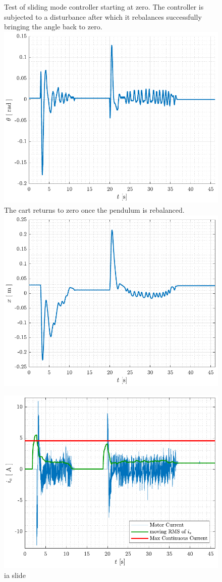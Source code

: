 %
\begin{figure}[H]
  \hspace{1cm}
  \captionbox
  {
    Test of sliding mode controller starting at zero. The controller is subjected to a disturbance after which it rebalances successfully bringing the angle back to zero.
    \label{fig:theta_slide}
  }
  {
    \hspace{-1cm}
    \includegraphics[width=.4\textwidth]{figures/theta_slide}
  }
  \hspace{20pt}
  \captionbox 
  {
    The cart returns to zero once the pendulum is rebalanced.
    \label{fig:x_slide}
  }
  {
    \hspace{-1cm}
    \includegraphics[width=.4\textwidth]{figures/x_slide}
  }  
\end{figure}

\begin{figure}[H]
  \includegraphics[width=.42\textwidth]{figures/ia_slide}
  \caption{ ia slide  }
  \label{fig:ia_slide}
\end{figure}


